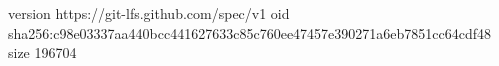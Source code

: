 version https://git-lfs.github.com/spec/v1
oid sha256:c98e03337aa440bcc441627633c85c760ee47457e390271a6eb7851cc64cdf48
size 196704
